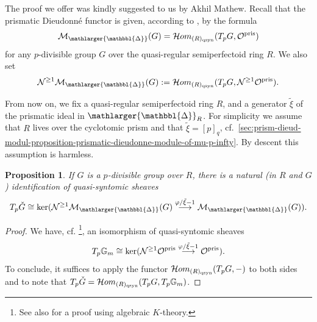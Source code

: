 \documentclass{amsart}
\newcommand{\prism}{{\mathlarger{\mathbbl{\Delta}}}}
\theoremstyle{plain}
\newtheorem{proposition}[theorem]{Proposition}
\theoremstyle{definition}
\newcommand{\tilxi}{\tilde{\xi}}
\newcommand{\blue}[1]{{\color{black}#1}}
\begin{document}
The proof we offer was kindly suggested to us by Akhil Mathew. Recall that the prismatic Dieudonn\'e functor is given, according to , by the formula
 \begin{equation}
   \label{eq:3}
\mathcal{M}_{\prism}(G)= \mathcal{H}om_{(R)_{\rm qsyn}}(T_pG, \mathcal{O}^{\rm pris})   
 \end{equation}
for any $p$-divisible group $G$ over the quasi-regular semiperfectoid ring $R$. \blue{We also set
$$
\mathcal{N}^{\geq 1} \mathcal{M}_\prism(G) := \mathcal{H}om_{(R)_{\rm qsyn}}(T_pG, \mathcal{N}^{\geq 1}\mathcal{O}^{\rm pris}).
$$   
}

From now on, we fix a quasi-regular semiperfectoid ring $R$, and a generator $\tilxi$ of the prismatic ideal in $\prism_R$. For simplicity we assume that $R$ lives over the cyclotomic prism and that $\tilxi=[p]_q$, cf.\ \ref{sec:prism-dieud-modul-proposition-prismatic-dieudonne-module-of-mu-p-infty}. By descent this assumption is harmless.

\begin{proposition}
\label{identification_from_bms2}
If $G$ is a $p$-divisible group over $R$, there is a natural (in $R$ and $G$) identification of quasi-syntomic sheaves
$$
T_p \check{G} \cong \ker(\mathcal{N}^{\geq 1} \mathcal{M}_\prism(G)  \overset{\varphi/\tilxi-1} \longrightarrow \mathcal{M}_\prism(G)).
$$
\end{proposition}
\begin{proof}
We have, cf. \cite[Theorem 7.5.6]{bhatt2022absolute}\footnote{See also \cite[Proposition 7.17]{bhatt_morrow_scholze_topological_hochschild_homology} for a proof using algebraic $K$-theory.}, an isomorphism of quasi-syntomic sheaves
$$
T_p \mathbb{G}_m \cong \ker(\mathcal{N}^{\geq 1} \mathcal{O}^{\rm pris} \overset{\varphi/\tilxi-1} \longrightarrow \mathcal{O}^{\rm pris}).
$$
To conclude, it suffices to apply the functor $\mathcal{H}om_{(R)_{\rm qsyn}}(T_p G,-)$ to both sides and to note that $T_p \check{G} = \mathcal{H}om_{(R)_{\rm qsyn}}(T_p G,T_p \mathbb{G}_m)$.
\end{proof}
\end{document}
